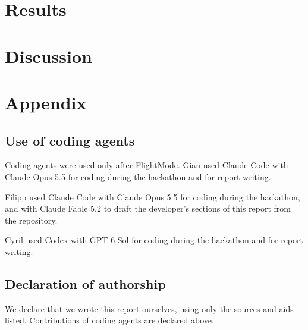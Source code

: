 \documentclass[10pt]{article}
\begin{document}
\section{Results}
\label{sec:results}





\section{Discussion}
\label{sec:discussion}








\appendix
\section{Appendix}

\subsection{Use of coding agents}

Coding agents were used only after FlightMode. Gian used Claude Code with Claude Opus 5.5 for coding during the hackathon and for report writing.

Filipp used Claude Code with Claude Opus 5.5 for coding during the hackathon, and with Claude Fable 5.2 to draft the developer's sections of this report from the repository.

Cyril used Codex with GPT-6 Sol for coding during the hackathon and for report writing.

\subsection{Declaration of authorship}

We declare that we wrote this report ourselves, using only the sources and aids listed. Contributions of coding agents are declared above.
\end{document}
